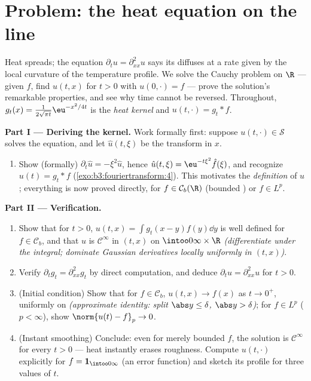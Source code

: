 \section{Problem: the heat equation on the line}

\begin{problem}[{Weekend problem --- $\partial_tu =
\partial^2_{xx}u$, solved end to end}]
\label{pb:b3:fouriertransform:1}
Heat spreads; the equation $\partial_tu = \partial_{xx}^2u$
says its  diffuses at a rate given by the local
curvature of the temperature profile. We solve the Cauchy
problem on $\R$ --- given $f$, find $u(t, x)$ for $t > 0$ with
$u(0, \cdot) = f$ --- prove the solution's remarkable
properties, and see why time cannot be reversed. Throughout,
$g_t(x) = \frac1{2\sqrt{\pi t}}\eu^{-x^2/4t}$ is the
\emph{heat kernel} and $u(t, \cdot) = g_t *
f$.

\medskip
\noindent\textbf{Part I --- Deriving the kernel.} Work
formally first: suppose $u(t, \cdot) \in \mathcal S$ solves
the equation, and let $\hat u(t, \xi)$ be the transform in
$x$.
\begin{enumerate}
  \item Show (formally) $\partial_t\hat u = -\xi^2\hat u$,
        hence $\hat u(t,\xi) = \eu^{-t\xi^2}\hat f(\xi)$, and
        recognize $u(t) = g_t * f$
        (\cref{exo:b3:fouriertransform:4}). This motivates the
        \emph{definition} of $u$; everything is now proved
        directly, for $f \in \mathcal C_b(\R)$ (bounded
        ) or $f \in L^p$.
\end{enumerate}

\medskip
\noindent\textbf{Part II --- Verification.}
\begin{enumerate}[resume]
  \item Show that for $t > 0$, $u(t, x) = \int
        g_t(x-y)f(y)\dd y$ is well defined for $f \in \mathcal
        C_b$, and that $u$ is $\mathcal C^\infty$ in $(t, x)$
        on $\intoo0\infty\times\R$ \emph{(differentiate under
        the integral; dominate Gaussian derivatives locally
        uniformly in $(t,x)$)}.
  \item Verify $\partial_tg_t = \partial^2_{xx}g_t$ by direct
        computation, and deduce $\partial_tu =
        \partial^2_{xx}u$ for $t > 0$.
  \item (Initial condition) Show that for $f \in \mathcal
        C_b$, $u(t, x) \to f(x)$ as $t \to 0^+$, uniformly on
         \emph{(approximate identity: split $\abs y
        \leq \delta$, $\abs y > \delta$)}; for $f \in L^p$
        ($p < \infty$), show $\norm{u(t) - f}_p \to 0$.
  \item (Instant smoothing) Conclude: even for merely bounded
         $f$, the solution is $\mathcal C^\infty$
        for every $t > 0$ --- heat instantly erases
        roughness. Compute $u(t, \cdot)$ explicitly for $f =
        \mathbf 1_{\intoo0\infty}$ (an error function) and
        sketch its profile for three values of $t$.
\end{enumerate}


\end{problem}
